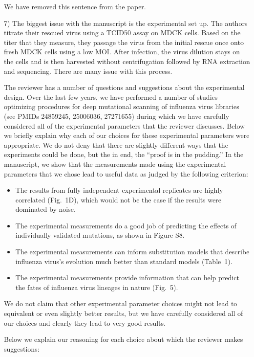 \documentclass[11pt, oneside]{article}   	%
\newcommand{\response}[1]{{\color{black}#1}}
\begin{document}
\response{We have removed this sentence from the paper.}

7) The biggest issue with the manuscript is the experimental set up. The authors titrate their rescued virus using a TCID50 assay on MDCK cells. Based on the titer that they measure, they passage the virus from the initial rescue once onto fresh MDCK cells using a low MOI. After infection, the virus dilution stays on the cells and is then harvested without centrifugation followed by RNA extraction and sequencing. There are many issue with this process. 

\response{The reviewer has a number of questions and suggestions about the experimental design.
Over the last few years, we have performed a number of studies optimizing procedures for deep mutational scanning of influenza virus libraries (see PMIDs 24859245, 25006036, 27271655) during which we have carefully considered all of the experimental parameters that the reviewer discusses.
Below we briefly explain why each of our choices for these experimental parameters were appropriate.
We do not deny that there are slightly different ways that the experiments could be done, but the in end, the ``proof is in the pudding.'' 
In the manuscript, we show that the measurements made using the experimental parameters that we chose lead to useful data as judged by the following criterion:
\begin{itemize}
\item The results from fully independent experimental replicates are highly correlated (Fig.~1D), which would not be the case if the results were dominated by noise.
\item The experimental measurements do a good job of predicting the effects of individually validated mutations, as shown in Figure S8.
\item The experimental measurements can inform substitution models that describe influenza virus's evolution much better than standard models (Table~1).
\item The experimental measurements provide information that can help predict the fates of influenza virus lineages in nature (Fig.~5).
\end{itemize}
We do not claim that other experimental parameter choices might not lead to equivalent or even slightly better results, but we have carefully considered all of our choices and clearly they lead to very good results.

Below we explain our reasoning for each choice about which the reviewer makes suggestions:
}
\end{document}
